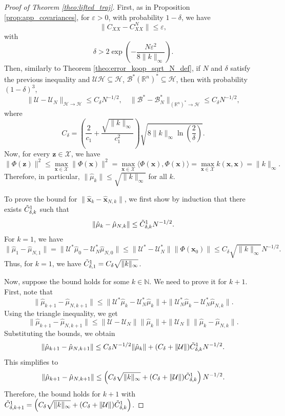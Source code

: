 \documentclass{article}
\newcommand{\R}{\mathbb{R}} %
\renewcommand{\H}{\mathcal{H}}
\newcommand{\U}{\mathcal{U}}
\newcommand{\B}{\mathcal{B}}
\begin{document}
\begin{proof}[Proof of Theorem \ref{theo:lifted_traj}]
    First, as in Proposition \ref{prop:app_covariances}, for \( \varepsilon > 0 \), with probability \( 1 - \delta \), we have
    \[
    \| C_{XX} - C_{XX}^N \| \leq \varepsilon,
    \]
    with
    \[
    \delta > 2 \exp \left( - \frac{N \varepsilon^2}{8 \| k \|_\infty} \right).
    \]
    Then, similarly to Theorem \ref{theo:error_koop_sqrt_N_def}, if \( N \) and \( \delta \) satisfy the previous inequality and \( \U\H \subseteq \H \), \( \B^*(\R^n)^* \subseteq \H \), then with probability \( (1 - \delta)^3 \),
    \[
    \| \U - \U_N \|_{\mathcal{H} \to \mathcal{H}} \leq C_\delta N^{-1/2}, \quad \| \B^* - \B_N^* \|_{(\R^n)^* \to \mathcal{H}} \leq C_\delta N^{-1/2},
    \]
    where
    \[
    C_\delta = \left( \frac{2}{c_1} + \frac{\sqrt{\| k \|_\infty}}{c_1^2} \right) \sqrt{8 \| k \|_\infty \ln \left( \frac{2}{\delta} \right)}.
    \]
    Now, for every \( \mathbf{z} \in \mathcal{X} \), we have
    \[
    \| \Phi(\mathbf{z}) \|^2 \leq \max_{\mathbf{x} \in \mathcal{X}} \| \Phi(\mathbf{x}) \|^2 = \max_{\mathbf{x} \in \mathcal{X}} \langle \Phi(\mathbf{x}), \Phi(\mathbf{x}) \rangle = \max_{\mathbf{x} \in \mathcal{X}} k(\mathbf{x}, \mathbf{x}) = \| k \|_\infty.
    \]
    Therefore, in particular, \( \| \hat{\mu}_k \| \leq \sqrt{\| k \|_\infty} \) for all \( k \).

    To prove the bound for \( \| \hat{\mathbf{x}}_k - \hat{\mathbf{x}}_{N,k} \| \), we first show by induction that there exists \( \Tilde{C}_{\delta,k}^1 \) such that
    \[
    \| \hat{\mu}_k - \hat{\mu}_{N,k} \| \leq \Tilde{C}_{\delta,k}^1 N^{-1/2}.
    \]
    For \( k = 1 \), we have
    \[
    \| \hat{\mu}_1 - \hat{\mu}_{N,1} \| = \| \U^* \hat{\mu}_0 - \U^*_N \hat{\mu}_{N,0} \| \leq \| \U^* - \U^*_N \| \| \Phi(\mathbf{x}_0) \| \leq C_\delta \sqrt{\| k \|_\infty} N^{-1/2}.
    \]
    Thus, for \( k = 1 \), we have \( \Tilde{C}_{\delta,1}^1 = C_\delta \sqrt{\| k \|_\infty} \).

    Now, suppose the bound holds for some \( k \in \mathbb{N} \). We need to prove it for \( k + 1 \). First, note that
    \[
    \| \hat{\mu}_{k+1} - \hat{\mu}_{N,k+1} \|
    \leq \| \U^* \hat{\mu}_k - \U^*_N \hat{\mu}_k \| + \| \U^*_N \hat{\mu}_k - \U^*_N \hat{\mu}_{N,k} \|.
    \]
    Using the triangle inequality, we get
    \[
    \| \hat{\mu}_{k+1} - \hat{\mu}_{N,k+1} \|
    \leq \| \U - \U_N \| \| \hat{\mu}_k \| + \| \U_N \| \| \hat{\mu}_k - \hat{\mu}_{N,k} \|.
    \]
    Substituting the bounds, we obtain
    \[
    \| \hat{\mu}_{k+1} - \hat{\mu}_{N,k+1} \|
    \leq C_\delta N^{-1/2} \| \hat{\mu}_k \| + (C_\delta + \| \U \|) \Tilde{C}_{\delta,k}^1 N^{-1/2}.
    \]
    This simplifies to
    \[
    \| \hat{\mu}_{k+1} - \hat{\mu}_{N,k+1} \|
    \leq \left( C_\delta \sqrt{\| k \|_\infty} + (C_\delta + \| \U \|) \Tilde{C}_{\delta,k}^1 \right) N^{-1/2}.
    \]
    Therefore, the bound holds for \( k + 1 \) with \( \Tilde{C}_{\delta,k+1}^1 = \left( C_\delta \sqrt{\| k \|_\infty} + (C_\delta + \| \U \|) \Tilde{C}_{\delta,k}^1 \right) \).


\end{proof}
\end{document}
